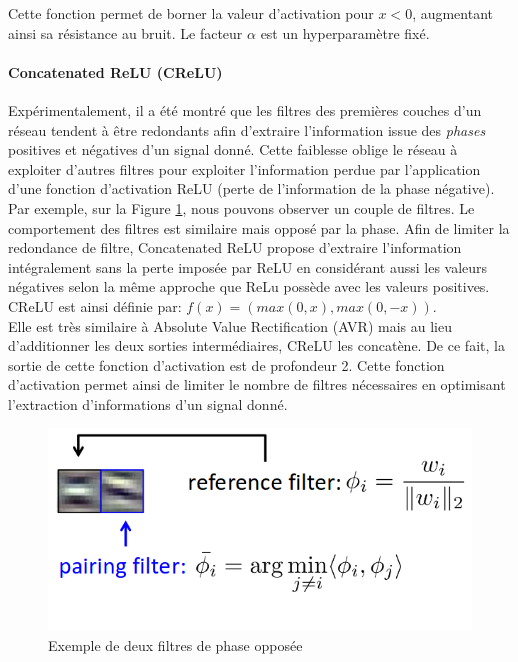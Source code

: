 \noindent Cette fonction permet de borner la valeur d'activation pour $x<0$, augmentant ainsi sa résistance au bruit. Le facteur $\alpha$ est un hyperparamètre fixé.

\paragraph{Concatenated ReLU (CReLU)}

Expérimentalement, il a été montré que les filtres des premières couches d'un réseau tendent à être redondants afin d'extraire l'information issue des \textit{phases} positives et négatives d'un signal donné. Cette faiblesse oblige le réseau à exploiter d'autres filtres pour exploiter l'information perdue par l'application d'une fonction d'activation ReLU (perte de l'information de la phase négative). Par exemple, sur la Figure \ref{phasefilter}, nous pouvons observer un couple de filtres. Le comportement des filtres est similaire mais opposé par la phase. Afin de limiter la redondance de filtre, Concatenated ReLU propose d'extraire l'information intégralement sans la perte imposée par ReLU en considérant aussi les valeurs négatives selon la même approche que ReLu possède avec les valeurs positives.\\

\noindent CReLU\cite{crelu} est ainsi définie par: $f(x)=(max(0,x), max(0, -x))$.\\

\noindent  Elle est très similaire à Absolute Value Rectification (AVR) mais au lieu d'additionner les deux sorties intermédiaires, CReLU les concatène. De ce fait, la sortie de cette fonction d'activation est de profondeur 2. Cette fonction d'activation permet ainsi de limiter le nombre de filtres nécessaires en optimisant l'extraction d'informations d'un signal donné.

\begin{figure}
\centering
\includegraphics[scale=0.4]{./tex/fondamentaux/filterphase.png}
\caption{Exemple de deux filtres de phase opposée}
\label{phasefilter}
\end{figure}

